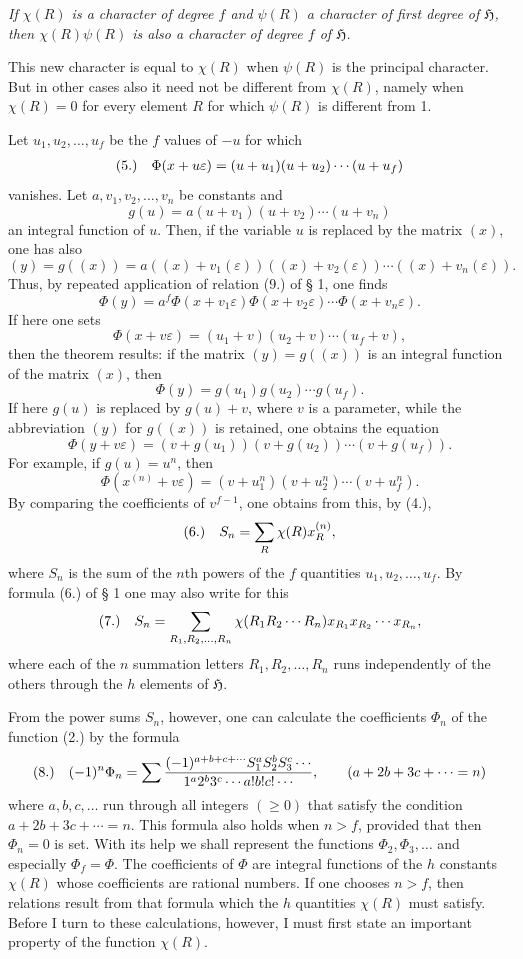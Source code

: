 \documentclass[11pt]{article}
\makeatletter
\newcommand{\Hgrp}{\mathfrak{H}}
\newcommand{\frobtag}[2]{\[\begin{array}{@{}r@{\quad}l@{}}\textup{(#1)} & \displaystyle #2\end{array}\]}
\newcommand{\frobtagc}[2]{\[\begin{array}{@{}r@{\quad}c@{}}\textup{(#1)} & \displaystyle #2\end{array}\]}
\makeatother
\begin{document}
\emph{If $\chi(R)$ is a character of degree $f$ and $\psi(R)$ a character of first degree of $\Hgrp$, then $\chi(R)\psi(R)$ is also a character of degree $f$ of $\Hgrp$.}

This new character is equal to $\chi(R)$ when $\psi(R)$ is the principal character. But in other cases also it need not be different from $\chi(R)$, namely when $\chi(R)=0$ for every element $R$ for which $\psi(R)$ is different from 1.

Let $u_1,u_2,\ldots,u_f$ be the $f$ values of $-u$ for which
\frobtagc{5.}{\Phi(x+u\varepsilon)=(u+u_1)(u+u_2)\cdots(u+u_f)}
vanishes. Let $a,v_1,v_2,\ldots,v_n$ be constants and
\[
g(u)=a(u+v_1)(u+v_2)\cdots(u+v_n)
\]
an integral function of $u$. Then, if the variable $u$ is replaced by the matrix $(x)$, one has also
\[
(y)=g((x))=a((x)+v_1(\varepsilon))((x)+v_2(\varepsilon))\cdots((x)+v_n(\varepsilon)).
\]
Thus, by repeated application of relation (9.) of § 1, one finds
\[
\Phi(y)=a^f\Phi(x+v_1\varepsilon)\Phi(x+v_2\varepsilon)\cdots\Phi(x+v_n\varepsilon).
\]
If here one sets
\[
\Phi(x+v\varepsilon)=(u_1+v)(u_2+v)\cdots(u_f+v),
\]
then the theorem results: if the matrix $(y)=g((x))$ is an integral function of the matrix $(x)$, then
\[
\Phi(y)=g(u_1)g(u_2)\cdots g(u_f).
\]
If here $g(u)$ is replaced by $g(u)+v$, where $v$ is a parameter, while the abbreviation $(y)$ for $g((x))$ is retained, one obtains the equation
\[
\Phi(y+v\varepsilon)=(v+g(u_1))(v+g(u_2))\cdots(v+g(u_f)).
\]
For example, if $g(u)=u^n$, then
\[
\Phi(x^{(n)}+v\varepsilon)=(v+u_1^n)(v+u_2^n)\cdots(v+u_f^n).
\]
By comparing the coefficients of $v^{f-1}$, one obtains from this, by (4.),
\frobtagc{6.}{S_n=\sum_R \chi(R)x_R^{(n)},}
where $S_n$ is the sum of the $n$th powers of the $f$ quantities $u_1,u_2,\ldots,u_f$. By formula (6.) of § 1 one may also write for this
\frobtagc{7.}{S_n=\sum_{R_1,R_2,\ldots,R_n}\chi(R_1R_2\cdots R_n)x_{R_1}x_{R_2}\cdots x_{R_n},}
where each of the $n$ summation letters $R_1,R_2,\ldots,R_n$ runs independently of the others through the $h$ elements of $\Hgrp$.

From the power sums $S_n$, however, one can calculate the coefficients $\Phi_n$ of the function (2.) by the formula
\frobtag{8.}{(-1)^n\Phi_n=\sum\frac{(-1)^{a+b+c+\cdots}S_1^aS_2^bS_3^c\cdots}{1^a2^b3^c\cdots a!b!c!\cdots},\qquad (a+2b+3c+\cdots=n)}
where $a,b,c,\ldots$ run through all integers $(\ge0)$ that satisfy the condition $a+2b+3c+\cdots=n$. This formula also holds when $n>f$, provided that then $\Phi_n=0$ is set. With its help we shall represent the functions $\Phi_2,\Phi_3,\ldots$ and especially $\Phi_f=\Phi$. The coefficients of $\Phi$ are integral functions of the $h$ constants $\chi(R)$ whose coefficients are rational numbers. If one chooses $n>f$, then relations result from that formula which the $h$ quantities $\chi(R)$ must satisfy. Before I turn to these calculations, however, I must first state an important property of the function $\chi(R)$.
\end{document}
